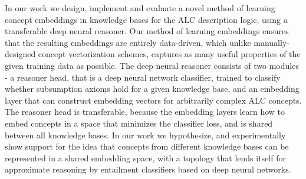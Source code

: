 In our work we design, implement and evaluate a novel method of learning concept embeddings in knowledge bases for the ALC description logic, using a transferable deep neural reasoner. Our method of learning embeddings ensures that the resulting embeddings are entirely data-driven, which unlike manually-designed concept vectorization schemes, captures as many useful properties of the given training data as possible. The deep neural reasoner consists of two modules - a reasoner head, that is a deep neural network classifier, trained to classify whether subsumption axioms hold for a given knowledge base, and an embedding layer that can construct embedding vectors for arbitrarily complex ALC concepts. The reasoner head is transferable, because the embedding layers learn how to embed concepts in a space that minimizes the classifier loss, and is shared between all knowledge bases. In our work we hypothesize, and experimentally show support for the idea that concepts from different knowledge bases can be represented in a shared embedding space, with a topology that lends itself for approximate reasoning by entailment classifiers based on deep neural networks.